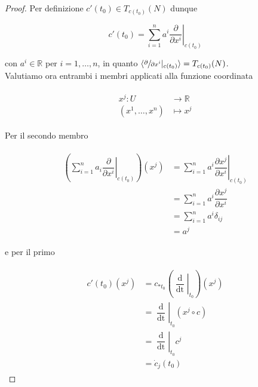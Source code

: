 \begin{proof}
	Per definizione $ c'(t_{0}) \in T_{c(t_{0})}(N) $ dunque
	
	\begin{equation}
		c'(t_{0}) = \sum_{i=1}^{n} a^{i} \left. \dfrac{\partial}{\partial x^{i}} \right|_{c(t_{0})}
	\end{equation}

	con $ a^{i} \in \mathbb{R} $ per $ i=1,\dots,n $, in quanto $ \langle \sfrac{\partial}{\partial x^{i}} |_{c(t_{0})} \rangle = T_{c(t_{0})}(N) $.\\
	Valutiamo ora entrambi i membri applicati alla funzione coordinata
	
	\begin{align}
		\begin{split}
			x^{j} : U &\to \mathbb{R}\\
			(x^{1},\dots,x^{n}) &\mapsto x^{j}
		\end{split}
	\end{align}

	Per il secondo membro
	
	\begin{align}
		\begin{split}
			\left( \sum_{i=1}^{n} a_{i} \left. \dfrac{\partial}{\partial x^{i}} \right|_{c(t_{0})} \right) (x^{j}) &= \sum_{i=1}^{n} a^{i} \left. \dfrac{\partial x^{j}}{\partial x^{i}} \right|_{c(t_{0})}\\
			&= \sum_{i=1}^{n} a^{i} \dfrac{\partial x^{j}}{\partial x^{i}}\\
			&= \sum_{i=1}^{n} a^{i} \delta_{ij}\\
			&= a^{j}
		\end{split}
	\end{align}

	e per il primo
	
	\begin{align}
		\begin{split}
			c'(t_{0})(x^{j}) &= c_{*t_{0}} \left( \left. \dfrac{\operatorname{d}}{\operatorname{dt}} \right|_{t_{0}} \right)(x^{j})\\
			&= \left. \dfrac{\operatorname{d}}{\operatorname{dt}} \right|_{t_{0}} (x^{j} \circ c)\\
			&= \left. \dfrac{\operatorname{d}}{\operatorname{dt}} \right|_{t_{0}} c^{j}\\
			&= \dot{c}_{j}(t_{0})
		\end{split}
	\end{align}
\end{proof}

